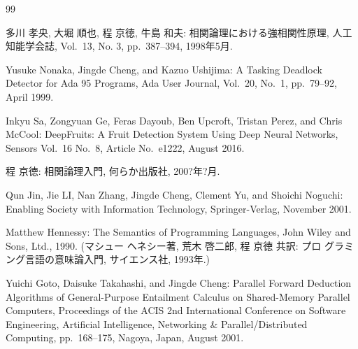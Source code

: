\documentclass[12pt,dvipdfmx]{jreport}
\begin{document}
\begin{thebibliography}{99}
\label{sannkoubunnkenn_chapter}

%


多川 孝央, 大堀 順也, 程 京徳, 牛島 和夫: 相関論理における強相関性原理,
        人工知能学会誌, Vol.\ 13, No. 3, pp.\ 387--394, 1998年5月.

Yusuke Nonaka, Jingde Cheng, and Kazuo Ushijima: A Tasking Deadlock
        Detector for Ada 95 Programs, Ada User Journal, Vol.\ 20, No.\ 1,
        pp.\ 79--92, April 1999.

        Inkyu Sa, Zongyuan Ge, Feras Dayoub, Ben Upcroft, Tristan Perez, and Chris McCool: DeepFruits: A Fruit Detection System Using Deep Neural Networks, Sensors Vol.\ 16 No.\ 8, Article No.\ e1222, August 2016.

        
程 京徳: 相関論理入門, 何らか出版社, 200?年?月.

Qun Jin, Jie LI, Nan Zhang, Jingde Cheng, Clement Yu, and Shoichi
        Noguchi: Enabling Society with Information Technology,
        Springer-Verlag, November 2001.

Matthew Hennessy: The Semantics of Programming Languages, John Wiley and
Sons, Ltd., 1990. (マシュー ヘネシー著, 荒木 啓二郎, 程 京徳 共訳: プロ
グラミング言語の意味論入門, サイエンス社, 1993年.)

Yuichi Goto, Daisuke Takahashi, and Jingde Cheng: Parallel Forward
        Deduction Algorithms of General-Purpose Entailment Calculus on
        Shared-Memory Parallel Computers, Proceedings of the ACIS 2nd
        International Conference on Software Engineering, Artificial
        Intelligence, Networking \& Parallel/Distributed Computing,
        pp.\ 168--175, Nagoya, Japan, August 2001.


\end{thebibliography}
\end{document}
